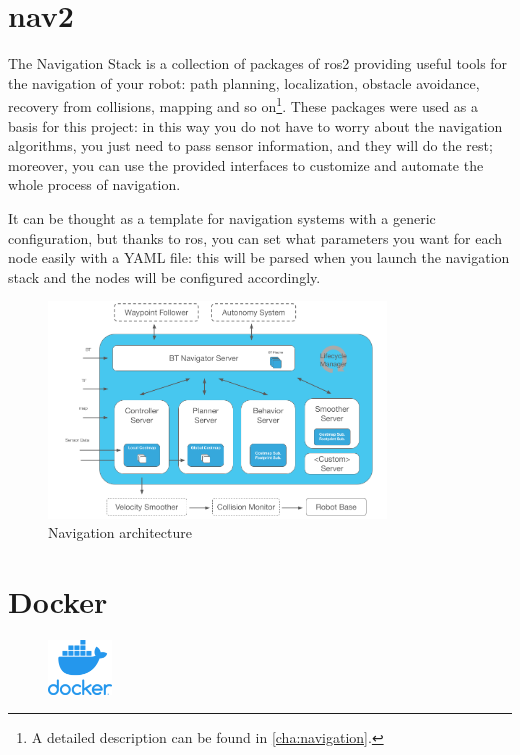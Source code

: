 \section{\acrfull{nav2}}

The Navigation Stack is a collection of packages of \acrshort{ros}2 providing useful tools for the navigation of your robot: path planning, localization, obstacle avoidance, recovery from collisions, mapping and so on\footnote{A detailed description can be found in \autoref{cha:navigation}.}. These packages were used as a basis for this project: in this way you do not have to worry about the navigation algorithms, you just need to pass sensor information, and they will do the rest; moreover, you can use the provided interfaces to customize and automate the whole process of navigation.

It can be thought as a template for navigation systems with a generic configuration, but thanks to \Acrshort{ros}, you can set what parameters you want for each node easily with a YAML file: this will be parsed when you launch the navigation stack and the nodes will be configured accordingly.

\begin{figure}[h]
    \centering
    \includegraphics[width=0.8\textwidth]{images/nav2_architecture}
    \caption{Navigation architecture}
  
  \end{figure}

\section{Docker}
  
\begin{figure}
    \includegraphics[width=0.15\textwidth]{images/docker}
\end{figure}
  
